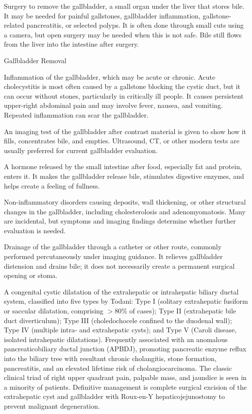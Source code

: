  Surgery to remove the gallbladder, a small organ under the liver that stores bile. It may be needed for painful gallstones, gallbladder inflammation, gallstone-related pancreatitis, or selected polyps. It is often done through small cuts using a camera, but open surgery may be needed when this is not safe. Bile still flows from the liver into the intestine after surgery.

\synonyms
Gallbladder Removal

 Inflammation of the gallbladder, which may be acute or chronic. Acute
cholecystitis is most often caused by a gallstone blocking the cystic duct, but it can occur without
stones, particularly in critically ill people. It causes persistent upper-right abdominal pain and
may involve fever, nausea, and vomiting. Repeated inflammation can scar the gallbladder.

 An imaging test of the gallbladder after contrast material is given to show how it fills, concentrates bile, and empties. Ultrasound, CT, or other modern tests are usually preferred for current gallbladder evaluation.

 A hormone released by the small intestine after food, especially fat and protein, enters it. It makes the gallbladder release bile, stimulates digestive enzymes, and helps create a feeling of fullness.

 Non-inflammatory disorders causing deposits, wall thickening, or other structural changes in the gallbladder, including cholesterolosis and adenomyomatosis. Many are incidental, but symptoms and imaging findings determine whether further evaluation is needed.

 Drainage of the gallbladder through a catheter or
other route, commonly performed percutaneously under imaging guidance. It
relieves gallbladder distension and drains bile; it does not necessarily create
a permanent surgical opening or stoma.

 A congenital cystic dilatation of the extrahepatic or intrahepatic biliary ductal system, classified into five types by Todani: Type I (solitary extrahepatic fusiform or saccular dilatation, comprising $>80\%$ of cases); Type II (extrahepatic bile duct diverticulum); Type III (choledochocele confined to the duodenal wall); Type IV (multiple intra- and extrahepatic cysts); and Type V (Caroli disease, isolated intrahepatic dilatations). Frequently associated with an anomalous pancreaticobiliary ductal junction (APBDJ), promoting pancreatic enzyme reflux into the biliary tree with resultant chronic cholangitis, stone formation, pancreatitis, and an elevated lifetime risk of cholangiocarcinoma. The classic clinical triad of right upper quadrant pain, palpable mass, and jaundice is seen in a minority of patients. Definitive management is complete surgical excision of the extrahepatic cyst and gallbladder with Roux-en-Y hepaticojejunostomy to prevent malignant degeneration.

